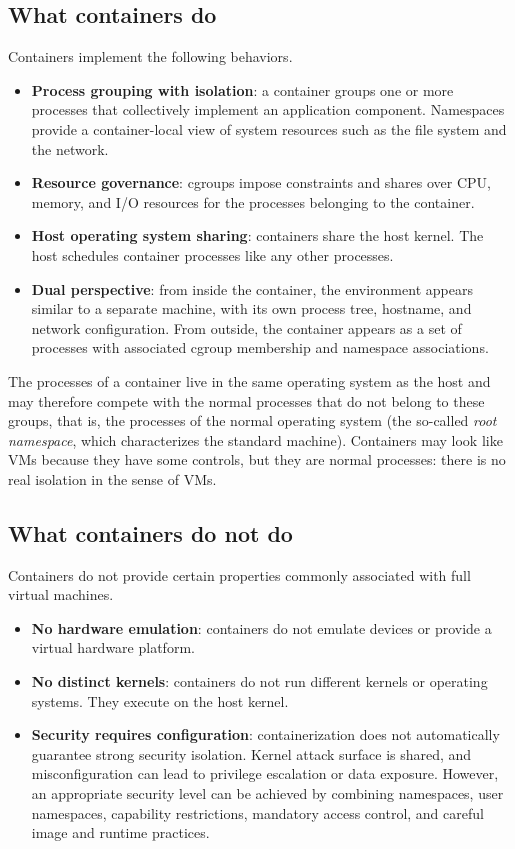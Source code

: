 \subsection{What containers do}

Containers implement the following behaviors.

\begin{itemize}
\item \textbf{Process grouping with isolation}: a container groups one or more processes that collectively implement an application component. Namespaces provide a container-local view of system resources such as the file system and the network.
\item \textbf{Resource governance}: cgroups impose constraints and shares over CPU, memory, and I/O resources for the processes belonging to the container.
\item \textbf{Host operating system sharing}: containers share the host kernel. The host schedules container processes like any other processes.
\item \textbf{Dual perspective}: from inside the container, the environment appears similar to a separate machine, with its own process tree, hostname, and network configuration. From outside, the container appears as a set of processes with associated cgroup membership and namespace associations.
\end{itemize}

The processes of a container live in the same operating system as the host and may therefore compete with the normal processes that do not belong to these groups, that is, the processes of the normal operating system (the so-called \emph{root namespace}, which characterizes the standard machine). Containers may look like VMs because they have some controls, but they are normal processes: there is no real isolation in the sense of VMs.

\subsection{What containers do not do}

Containers do not provide certain properties commonly associated with full virtual machines.

\begin{itemize}
\item \textbf{No hardware emulation}: containers do not emulate devices or provide a virtual hardware platform.
\item \textbf{No distinct kernels}: containers do not run different kernels or operating systems. They execute on the host kernel.
\item \textbf{Security requires configuration}: containerization does not automatically guarantee strong security isolation. Kernel attack surface is shared, and misconfiguration can lead to privilege escalation or data exposure. However, an appropriate security level can be achieved by combining namespaces, user namespaces, capability restrictions, mandatory access control, and careful image and runtime practices.
\end{itemize}

